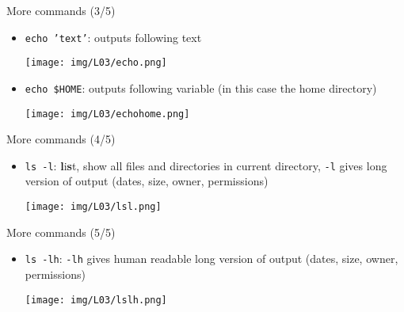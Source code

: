 \documentclass[hyperref={pdfpagelabels=false},aspectratio=169]{beamer}
\begin{document}
\begin{frame}{More commands \small (3/5)}

    \begin{itemize}
        \item \texttt{echo 'text'}: outputs following text
        
        \vspace{2pt}
        \texttt{[image: img/L03/echo.png]}

        \item \texttt{echo \$HOME}: outputs following variable (in this case the home directory)
        
        \vspace{2pt}
        \texttt{[image: img/L03/echohome.png]}
    
    \end{itemize}
    
\end{frame}


\begin{frame}{More commands \small (4/5)}

    \begin{itemize}
        \item \texttt{ls -l}: \textbf{l}i\textbf{s}t, show all files and directories in current directory, \texttt{-l} gives long version of output (dates, size, owner, permissions)
    
        \vspace{2pt}
        \texttt{[image: img/L03/lsl.png]}
    
    \end{itemize}
    
\end{frame}

\begin{frame}{More commands \small (5/5)}

    \begin{itemize}
        \item \texttt{ls -lh}: \texttt{-lh} gives human readable long version of output (dates, size, owner, permissions)
    
        \vspace{2pt}
        \texttt{[image: img/L03/lslh.png]}
        
    \end{itemize}
        
\end{frame}
\end{document}
